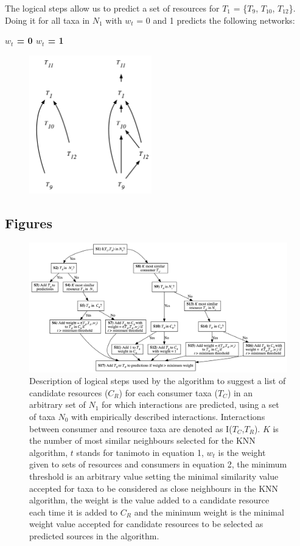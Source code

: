 \documentclass[letterpaper]{article}
\begin{document}
The logical steps allow us to predict a set of resources for $T_1$ = \{$T_9$, $T_{10}$, $T_{12}$\}. Doing it for all taxa in $N_1$ with $w_t$ = 0 and 1 predicts the following networks:
\bigskip

\centerline{\textbf{$w_t$ = 0 \quad \quad \quad \quad \quad $w_t$ = 1} \quad}
    \begin{figure}[h!]
    \centering\includegraphics[height = 6cm]{example.png}
    \end{figure}

\newpage
\subsection{Figures}
    \begin{figure}[h]
      \centering\includegraphics[width=\textwidth]{Decision_Diagram.png}
      \caption{Description of logical steps used by the algorithm to suggest a list of candidate resources ($C_R$) for each consumer taxa ($T_C$) in an arbitrary set of $N_1$ for which interactions are predicted, using a set of taxa $N_0$ with empirically described interactions. Interactions between consumer and resource taxa are denoted as I($T_C$,$T_R$). $K$ is the number of most similar neighbours selected for the KNN algorithm, $t$ stands for tanimoto in equation 1, $w_t$ is the weight given to sets of resources and consumers in equation 2, the minimum threshold is an arbitrary value setting the minimal similarity value accepted for taxa to be considered as close neighbours in the KNN algorithm, the weight is the value added to a candidate resource each time it is added to $C_R$ and the minimum weight is the minimal weight value accepted for candidate resources to be selected as predicted sources in the algorithm.}
      \label{fig:decision_diag}
\end{figure}
\end{document}
